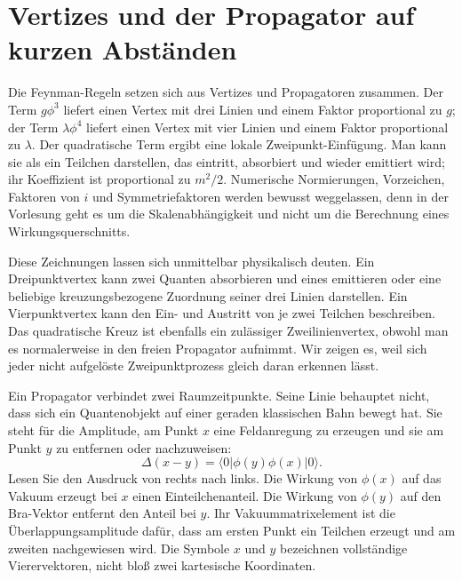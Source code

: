 \begin{classroomqa}\end{classroomqa}

\section{Vertizes und der Propagator auf kurzen Abständen}

Die Feynman-Regeln setzen sich aus Vertizes und Propagatoren zusammen. Der Term \(g\phi^3\) liefert einen Vertex mit drei Linien und einem Faktor proportional zu \(g\); der Term \(\lambda\phi^4\) liefert einen Vertex mit vier Linien und einem Faktor proportional zu \(\lambda\). Der quadratische Term ergibt eine lokale Zweipunkt-Einfügung. Man kann sie als ein Teilchen darstellen, das eintritt, absorbiert und wieder emittiert wird; ihr Koeffizient ist proportional zu \(m^2/2\). Numerische Normierungen, Vorzeichen, Faktoren von \(i\) und Symmetriefaktoren werden bewusst weggelassen, denn in der Vorlesung geht es um die Skalenabhängigkeit und nicht um die Berechnung eines Wirkungsquerschnitts.

Diese Zeichnungen lassen sich unmittelbar physikalisch deuten. Ein Dreipunktvertex kann zwei Quanten absorbieren und eines emittieren oder eine beliebige kreuzungsbezogene Zuordnung seiner drei Linien darstellen. Ein Vierpunktvertex kann den Ein- und Austritt von je zwei Teilchen beschreiben. Das quadratische Kreuz ist ebenfalls ein zulässiger Zweilinienvertex, obwohl man es normalerweise in den freien Propagator aufnimmt. Wir zeigen es, weil sich jeder nicht aufgelöste Zweipunktprozess gleich daran erkennen lässt.

Ein Propagator verbindet zwei Raumzeitpunkte. Seine Linie behauptet nicht, dass sich ein Quantenobjekt auf einer geraden klassischen Bahn bewegt hat. Sie steht für die Amplitude, am Punkt \(x\) eine Feldanregung zu erzeugen und sie am Punkt \(y\) zu entfernen oder nachzuweisen: \begin{equation}
\Delta(x-y)=\langle0|\phi(y)\phi(x)|0\rangle.
\label{eq:position-propagator}
\end{equation}Lesen Sie den Ausdruck von rechts nach links. Die Wirkung von \(\phi(x)\) auf das Vakuum erzeugt bei \(x\) einen Einteilchenanteil. Die Wirkung von \(\phi(y)\) auf den Bra-Vektor entfernt den Anteil bei \(y\). Ihr Vakuummatrixelement ist die Überlappungsamplitude dafür, dass am ersten Punkt ein Teilchen erzeugt und am zweiten nachgewiesen wird. Die Symbole \(x\) und \(y\) bezeichnen vollständige Vierervektoren, nicht bloß zwei kartesische Koordinaten.

